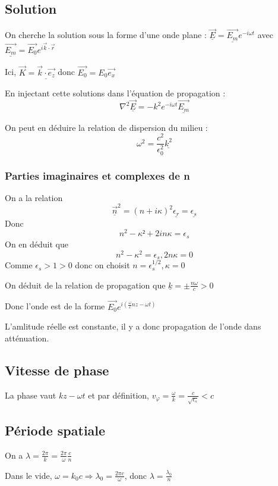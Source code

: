 \documentclass[french]{yLectureNote}
\renewcommand{\vec}{\overrightarrow}
\newcommand{\lap}{\nabla^2}
\begin{document}
\subsection{Solution}
On cherche la solution sous la forme d'une onde plane : $\underline{\vec{E}} = \underline{\vec{E_m}} e^{-i\omega t}$ avec $\underline{\vec{E_m}} = \vec{E_0}e^{i\vec{k}\cdot \vec{r}}$

Ici, $\vec{K} = \underline{\vec{k}\cdot \vec{e_z}}$ donc $\vec{E_0} = E_0\vec{e_x}$%

En injectant cette solutions dans l'équation de propagation :
$$\lap \underline{\vec{E}} = -k^2 e^{-i\omega t} \underline{\vec{E_m}}$$
 
 On peut en déduire la relation de dispersion du milieu :
 $$\omega^2 = \frac{c^2}{\epsilon_0^2}\underline{k^2}$$
\subsubsection{Parties imaginaires et complexes de n}
On a la relation 
$$\underline{\vec{n}}^2 = (n+i\kappa)^2 \underline{\epsilon_r} = \underline{\epsilon_s}$$
Donc 
$$n^2-\kappa² +2in\kappa = \epsilon_s$$
On en déduit que
$$n^2-\kappa^2 = \epsilon_s, 2n\kappa=0$$
Comme $\epsilon_s >1>0$ donc on choisit $n=\epsilon_s^{1/2}, \kappa=0$

On déduit de la relation de propagation que $\underline{k} = \pm \frac{n\omega}{c}>0$

Donc l'onde est de la forme $\vec{E_0}e^{i(\frac{\omega}{c}nz-\omega t)}$

L'amlitude réelle est constante, il y a  donc propagation de l'onde dans atténuation.

\subsection{Vitesse de phase}
La phase vaut $kz-\omega t$ et par définition, $v_{\varphi} = \frac{\omega}{k} = \frac{c}{\sqrt{\epsilon_s}}<c$
\subsection{Période spatiale}
On a $\lambda = \frac{2\pi}{k} = \frac{2\pi}{\omega}\frac{c}{n}$

Dans le vide, $\omega  = k_0c\Rightarrow \lambda_0 =\frac{2\pi c}{\omega}$, donc $\lambda = \frac{\lambda_0}{n}$
\end{document}
